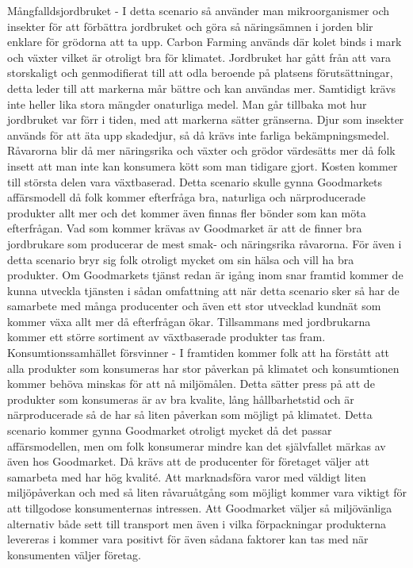 \documentclass[10pt,a4paper,oneside]{article}
\begin{document}
Mångfalldsjordbruket - I detta scenario så använder man mikroorganismer och insekter för att förbättra jordbruket och göra så näringsämnen i jorden blir enklare för grödorna att ta upp. Carbon Farming används där kolet binds i mark och växter vilket är otroligt bra för klimatet. Jordbruket har gått från att vara storskaligt och genmodifierat till att odla beroende på platsens förutsättningar, detta leder till att markerna mår bättre och kan användas mer. Samtidigt krävs inte heller lika stora mängder onaturliga medel. Man går tillbaka mot hur jordbruket var förr i tiden, med att markerna sätter gränserna. Djur som insekter används för att äta upp skadedjur, så då krävs inte farliga bekämpningsmedel.  Råvarorna blir då mer näringsrika och växter och grödor värdesätts mer då folk insett att man inte kan konsumera kött som man tidigare gjort. Kosten kommer till största delen vara växtbaserad. Detta scenario skulle gynna Goodmarkets affärsmodell då folk kommer efterfråga bra, naturliga och närproducerade produkter allt mer och det kommer även finnas fler bönder som kan möta efterfrågan. Vad som kommer krävas av Goodmarket är att de finner bra jordbrukare som producerar de mest smak- och näringsrika råvarorna. För även i detta scenario bryr sig folk otroligt mycket om sin hälsa och vill ha bra produkter. Om Goodmarkets tjänst redan är igång inom snar framtid kommer de kunna utveckla tjänsten i sådan omfattning att när detta scenario sker så har de samarbete med många producenter och även ett stor utvecklad kundnät som kommer växa allt mer då efterfrågan ökar. Tillsammans med jordbrukarna kommer ett större sortiment av växtbaserade produkter tas fram. \\

Konsumtionssamhället försvinner - I framtiden kommer folk att ha förstått att alla produkter som konsumeras har stor påverkan på klimatet och konsumtionen kommer behöva minskas för att nå miljömålen. Detta sätter press på att de produkter som konsumeras är av bra kvalite, lång hållbarhetstid och är närproducerade så de har så liten påverkan som möjligt på klimatet. Detta scenario kommer gynna Goodmarket otroligt mycket då det passar affärsmodellen, men om folk konsumerar mindre kan det självfallet märkas av även hos Goodmarket. Då krävs att de producenter för företaget väljer att samarbeta med har hög kvalité. Att marknadsföra varor med väldigt liten miljöpåverkan och med så liten råvaruåtgång som möjligt kommer vara viktigt för att tillgodose konsumenternas intressen. Att Goodmarket väljer så miljövänliga alternativ både sett till transport men även i vilka förpackningar produkterna levereras i kommer vara positivt för även sådana faktorer kan tas med när konsumenten väljer företag. 
\end{document}
